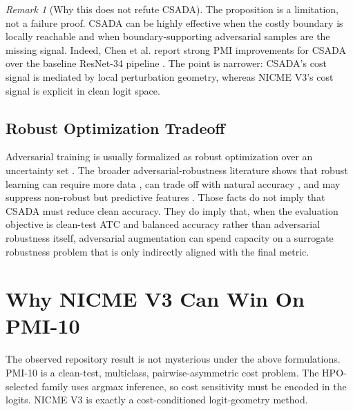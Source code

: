 \documentclass[11pt]{article}
\theoremstyle{definition}
\theoremstyle{plain}
\theoremstyle{remark}
\newtheorem{remark}{Remark}
\begin{document}
\begin{remark}[Why this does not refute CSADA]
The proposition is a limitation, not a failure proof.
CSADA can be highly effective when the costly boundary is locally reachable and when boundary-supporting adversarial samples are the missing signal.
Indeed, Chen et al. report strong PMI improvements for CSADA over the baseline ResNet-34 pipeline \cite{chen2025csada}.
The point is narrower: CSADA's cost signal is mediated by local perturbation geometry, whereas NICME V3's cost signal is explicit in clean logit space.
\end{remark}

\subsection{Robust Optimization Tradeoff}

Adversarial training is usually formalized as robust optimization over an uncertainty set \cite{madry2018towards}.
The broader adversarial-robustness literature shows that robust learning can require more data \cite{schmidt2018robust}, can trade off with natural accuracy \cite{zhang2019trades}, and may suppress non-robust but predictive features \cite{ilyas2019features}.
Those facts do not imply that CSADA must reduce clean accuracy.
They do imply that, when the evaluation objective is clean-test ATC and balanced accuracy rather than adversarial robustness itself, adversarial augmentation can spend capacity on a surrogate robustness problem that is only indirectly aligned with the final metric.

\section{Why NICME V3 Can Win On PMI-10}

The observed repository result is not mysterious under the above formulations.
PMI-10 is a clean-test, multiclass, pairwise-asymmetric cost problem.
The HPO-selected family uses argmax inference, so cost sensitivity must be encoded in the logits.
NICME V3 is exactly a cost-conditioned logit-geometry method.
\end{document}
